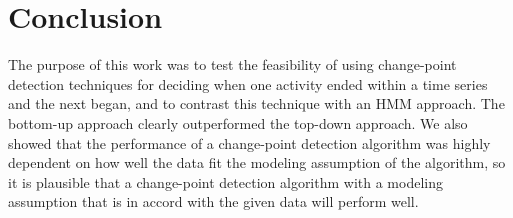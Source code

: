 \chapter{Conclusion}
The purpose of this work was to test the feasibility of using change-point
detection techniques for deciding when one activity ended within a time series
and the next began, and to contrast this technique with an HMM approach.
The bottom-up approach clearly outperformed
the top-down approach. We also showed that the performance of a change-point
detection algorithm was highly dependent on how well the data fit the modeling
assumption of the algorithm, so it is plausible that a change-point detection
algorithm with a modeling assumption that is in accord with the given data will
perform well.
